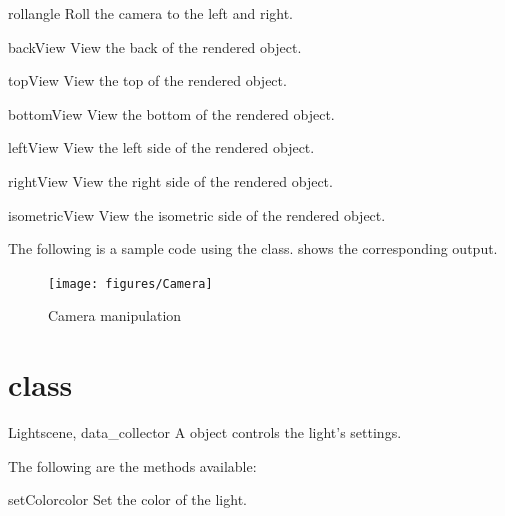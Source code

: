 \begin{methoddesc}[Camera]{roll}{angle}
Roll the camera to the left and right.
\end{methoddesc}

\begin{methoddesc}[Camera]{backView}{}
View the back of the rendered object.
\end{methoddesc}

\begin{methoddesc}[Camera]{topView}{}
View the top of the rendered object.
\end{methoddesc}

\begin{methoddesc}[Camera]{bottomView}{}
View the bottom of the rendered object.
\end{methoddesc}

\begin{methoddesc}[Camera]{leftView}{}
View the left side of the rendered object.
\end{methoddesc}

\begin{methoddesc}[Camera]{rightView}{}
View the right side of the rendered object.
\end{methoddesc}

\begin{methoddesc}[Camera]{isometricView}{}
View the isometric side of the rendered object.
\end{methoddesc}

The following is a sample code using the \Camera class. 
 shows the corresponding output. 


\begin{figure}[ht]
\begin{center}
\texttt{[image: figures/Camera]}
\end{center}
\caption{Camera manipulation}
\label{fig:camera.1}
\end{figure}

\section{\Light class}
\begin{classdesc}{Light}{scene, data_collector}
A \Light object controls the light's settings. 
\end{classdesc}

The following are the methods available:
\begin{methoddesc}[Light]{setColor}{color}
Set the color of the light.
\end{methoddesc}


